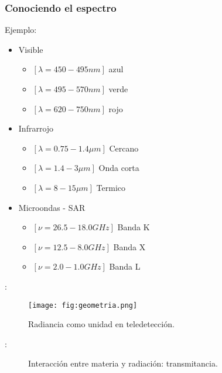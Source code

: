 \begin{frame}
  \frametitle{Conociendo el espectro}
  \begin{exampleblock}{Ejemplo:}
    \begin{itemize}
      \item<1,4> Visible
      \begin{itemize}
        \item<1,4> $[\lambda=450-495 nm]$ {\color{blue} azul}
        \item<1,4> $[\lambda=495-570 nm]$ {\color{green} verde}
        \item<1,4> $[\lambda=620-750 nm]$ {\color{red} rojo}
      \end{itemize}
      \item<2,4> Infrarrojo
      \begin{itemize}
        \item<2,4> $[\lambda=0.75-1.4\mu m]$ Cercano
        \item<2,4> $[\lambda=1.4-3\mu m]$ Onda corta
        \item<2,4> $[\lambda=8-15\mu m]$ Termico
      \end{itemize}
      \item<3,4> Microondas - SAR
      \begin{itemize}
        \item<3,4> $[\nu = 26.5 -18.0 GHz]$ Banda K
        \item<3,4> $[\nu = 12.5 - 8.0 GHz]$ Banda X
        \item<3,4> $[\nu = 2.0 - 1.0 GHz] $ Banda L
      \end{itemize}
    \end{itemize}
  \end{exampleblock}
\end{frame}


\begin{frame}{\secname : \subsecname}
  \begin{figure}
    \centering
    \texttt{[image: fig:geometria.png]}
    \caption{Radiancia como unidad en teledetección.}
    \label{}
  \end{figure}
\end{frame}

\begin{frame}{\secname : \subsecname}
  \begin{figure}
    \centering
    \caption{Interacción entre materia y radiación: transmitancia.}
    \label{}
  \end{figure}
\end{frame}

